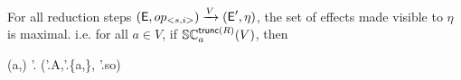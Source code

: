 %
%
\begin{theorem}
\label{theorem:two}
For all reduction steps
{\footnotesize $
({\normalfont \textsf{E}},op_{<s,i>}) 
    \xrightarrow{V}
  ({\normalfont \textsf{E}}',\eta) 
$},
the set of effects made visible to $\eta$ is maximal. i.e. for all
 {\footnotesize $a \in V$}, if 
 {\footnotesize $ \SC {\trunc{R}} a V$}, then 
\begin{fmathpar}
(a,\eta) \not\in \E'.\visZ \Rightarrow 
(\E'.A,\E'.\visZ \cup \{a,\eta\}, \E'.so) \not\models \psi[\eta/\hat{\eta}]
\end{fmathpar}
\end{theorem}

